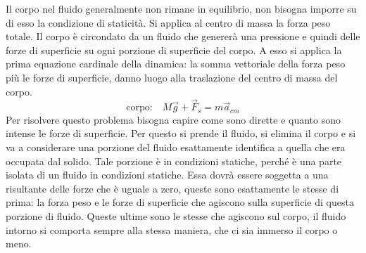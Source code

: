 \documentclass[10pt,a4paper]{book}
\begin{document}
Il corpo nel fluido generalmente non rimane in equilibrio, non bisogna imporre su di esso la condizione di staticità. Si applica al centro di massa la forza peso totale. Il corpo è circondato da un fluido che genererà una pressione e quindi delle forze di superficie su ogni porzione di superficie del corpo. A esso si applica la prima equazione cardinale della dinamica: la somma vettoriale della forza peso più le forze di superficie, danno luogo alla traslazione del centro di massa del corpo.
\[
	\text{corpo:} \quad M\vec{g} + \vec{F}_s = m\vec{a}_{cm}
\]
Per risolvere questo problema bisogna capire come sono dirette e quanto sono intense le forze di superficie. Per questo si prende il fluido, si elimina il corpo e si va a considerare una porzione del fluido esattamente identifica a quella che era occupata dal solido. Tale porzione è in condizioni statiche, perché è una parte isolata di un fluido in condizioni statiche. Essa dovrà essere soggetta a una risultante delle forze che è uguale a zero, queste sono esattamente le stesse di prima: la forza peso e le forze di superficie che agiscono sulla superficie di questa porzione di fluido. Queste ultime sono le stesse che agiscono sul corpo, il fluido intorno si comporta sempre alla stessa maniera, che ci sia immerso il corpo o meno.
\end{document}
